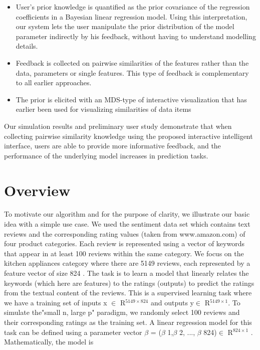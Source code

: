 \documentclass{sig-alternate}
\begin{document}
\begin{itemize}
   
    \item User's prior knowledge is quantified as the prior covariance
of the regression coefficients in a Bayesian linear regression
model. Using this interpretation, our system lets the user
manipulate the prior distribution of the model parameter indirectly by his feedback, without having to understand modelling details.

    \item  Feedback is collected on pairwise similarities of the features
rather than the data, parameters or single features.
This type of feedback is complementary to all earlier approaches.

    \item The prior is elicited with an MDS-type of interactive visualization
that has earlier been used for visualizing similarities
of data items

\end{itemize}

Our simulation results and preliminary user study demonstrate that
when collecting pairwise similarity knowledge using the proposed
interactive intelligent interface, users are able to provide more
informative feedback, and the performance of the underlying model
increases in prediction tasks.

\section{Overview}

To motivate our algorithm and for the purpose of clarity, we illustrate
our basic idea with a simple use case. We used the sentiment
data set \cite{P07-1056} which contains text reviews and the corresponding
rating values (taken from www.amazon.com) of four product categories.
Each review is represented using a vector of keywords that
appear in at least 100 reviews within the same category. We focus
on the kitchen appliances category where there are 5149 reviews,
each represented by a feature vector of size 824 \cite{Hernandez-Lobato:2015:EPL:2783156.2783164}. The task is
to learn a model that linearly relates the keywords (which here
are features) to the ratings (outputs) to predict the ratings from
the textual content of the reviews. This is a supervised learning
task where we have a training set of inputs x $\in$ R$^{5149\times824}$ and
outputs y$\in$ R$^{5149\times1}$. To simulate the"small n, large p" paradigm,
we randomly select 100 reviews and their corresponding ratings as
the training set.
A linear regression model for this task can be defined using a
parameter vector $\beta$ = ($\beta$ 1,$\beta$ 2, ..., $\beta$ 824)$\in$ R$^{824\times1}$ . Mathematically, the model is \\ 
\end{document}
